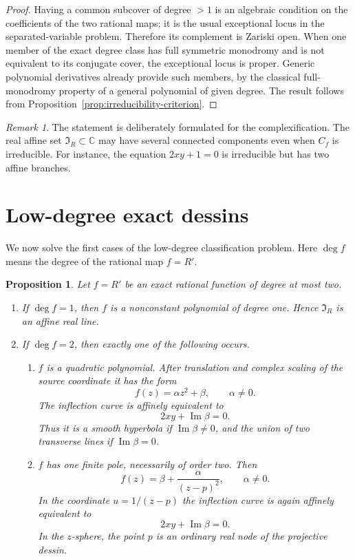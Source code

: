 \documentclass[11pt,reqno]{amsart}
\newtheorem{proposition}[theorem]{Proposition}
\theoremstyle{definition}
\theoremstyle{remark}
\newtheorem{remark}[theorem]{Remark}
\newcommand{\C}{\mathbb C}
\newcommand{\I}{\mathfrak I}
\renewcommand{\Im}{\operatorname{Im}}
\begin{document}
\begin{proof}
Having a common subcover of degree $>1$ is an algebraic condition on the coefficients of the two rational maps; it is the usual exceptional locus in the separated-variable problem.  Therefore its complement is Zariski open. When one member of the exact degree class has full symmetric monodromy and is not equivalent to its conjugate cover, the exceptional locus is proper.  Generic polynomial derivatives already provide such members, by the classical full-monodromy property of a general polynomial of given degree.  The result follows from Proposition~\ref{prop:irreducibility-criterion}.
\end{proof}

\begin{remark}
The statement is deliberately formulated for the complexification.  The real affine set $\I_R\subset\C$ may have several connected components even when $C_f$ is irreducible.  For instance, the equation $2xy+1=0$ is irreducible but has two affine branches.
\end{remark}

\section{Low-degree exact dessins}\label{sec:LowDegree}

We now solve the first cases of the low-degree classification problem.  Here $\deg f$ means the degree of the rational map $f=R'$.

\begin{proposition}\label{prop:degree-one-two}
Let $f=R'$ be an exact rational function of degree at most two.
\begin{enumerate}[label=(\alph*)]
\item If $\deg f=1$, then $f$ is a nonconstant polynomial of degree one.  Hence $\I_R$ is an affine real line.
\item If $\deg f=2$, then exactly one of the following occurs.
\begin{enumerate}[label=(\roman*)]
\item $f$ is a quadratic polynomial.  After translation and complex scaling of the source coordinate it has the form
\[
        f(z)=\alpha z^2+\beta,
        \qquad \alpha\ne0.
\]
The inflection curve is affinely equivalent to
\[
        2xy+\Im\beta=0.
\]
Thus it is a smooth hyperbola if $\Im\beta\ne0$, and the union of two transverse lines if $\Im\beta=0$.
\item $f$ has one finite pole, necessarily of order two.  Then
\[
        f(z)=\beta+\frac{\alpha}{(z-p)^2},
        \qquad \alpha\ne0.
\]
In the coordinate $u=1/(z-p)$ the inflection curve is again affinely equivalent to
\[
        2xy+\Im\beta=0.
\]
In the $z$-sphere, the point $p$ is an ordinary real node of the projective dessin.
\end{enumerate}
\end{enumerate}
\end{proposition}
\end{document}
